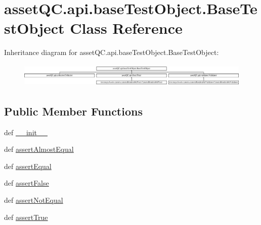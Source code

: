 \hypertarget{classassetQC_1_1api_1_1baseTestObject_1_1BaseTestObject}{\section{asset\-Q\-C.\-api.\-base\-Test\-Object.\-Base\-Test\-Object \-Class \-Reference}
\label{d6/dac/classassetQC_1_1api_1_1baseTestObject_1_1BaseTestObject}
}
\-Inheritance diagram for asset\-Q\-C.\-api.\-base\-Test\-Object.\-Base\-Test\-Object\-:\begin{figure}[H]
\begin{center}
\leavevmode
\includegraphics[height=1.161826cm]{d6/dac/classassetQC_1_1api_1_1baseTestObject_1_1BaseTestObject}
\end{center}
\end{figure}
\subsection*{\-Public \-Member \-Functions}
\begin{DoxyCompactItemize}
\item 
def \hyperlink{classassetQC_1_1api_1_1baseTestObject_1_1BaseTestObject_a4713f4c6dfd4bb368c257780f83089a5}{\-\_\-\-\_\-init\-\_\-\-\_\-}
\item 
def \hyperlink{classassetQC_1_1api_1_1baseTestObject_1_1BaseTestObject_a9781aa223b9f82906792b978de37a509}{assert\-Almost\-Equal}
\item 
def \hyperlink{classassetQC_1_1api_1_1baseTestObject_1_1BaseTestObject_a555762e9fa8a4e4d58cc526d461040e6}{assert\-Equal}
\item 
def \hyperlink{classassetQC_1_1api_1_1baseTestObject_1_1BaseTestObject_a903c9f3cdcefa80fe031b7bc7ca81164}{assert\-False}
\item 
def \hyperlink{classassetQC_1_1api_1_1baseTestObject_1_1BaseTestObject_a4bccc5a1c3c07f7c62a0085eff1e518f}{assert\-Not\-Equal}
\item 
def \hyperlink{classassetQC_1_1api_1_1baseTestObject_1_1BaseTestObject_a98d84a72885133272a59c68d3b6609a3}{assert\-True}
\end{DoxyCompactItemize}


